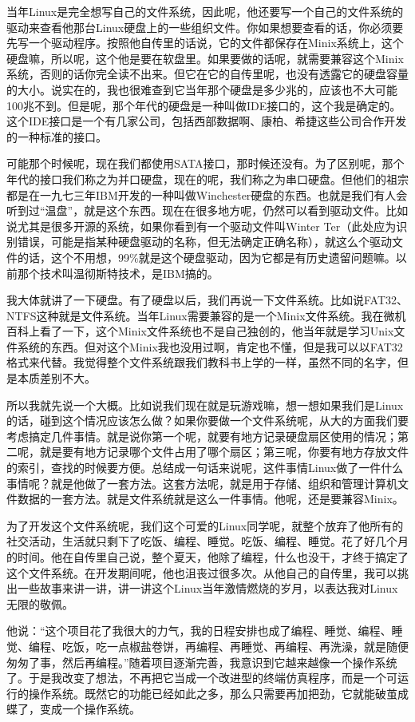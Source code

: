 \documentclass[
  letterpaper,
  DIV=11,
  numbers=noendperiod]{scrreprt}
\begin{document}
当年Linux是完全想写自己的文件系统，因此呢，他还要写一个自己的文件系统的驱动来查看他那台Linux硬盘上的一些组织文件。你如果想要查看的话，你必须要先写一个驱动程序。按照他自传里的话说，它的文件都保存在Minix系统上，这个硬盘嘛，所以呢，这个他是要在软盘里。如果要做的话呢，就需要兼容这个Minix系统，否则的话你完全读不出来。但它在它的自传里呢，也没有透露它的硬盘容量的大小。说实在的，我也很难查到它当年那个硬盘是多少兆的，应该也不大可能100兆不到。但是呢，那个年代的硬盘是一种叫做IDE接口的，这个我是确定的。这个IDE接口是一个有几家公司，包括西部数据啊、康柏、希捷这些公司合作开发的一种标准的接口。

可能那个时候呢，现在我们都使用SATA接口，那时候还没有。为了区别呢，那个年代的接口我们称之为并口硬盘，现在的呢，我们称之为串口硬盘。但他们的祖宗都是在一九七三年IBM开发的一种叫做Winchester硬盘的东西。也就是我们有人会听到过``温盘''，就是这个东西。现在在很多地方呢，仍然可以看到驱动文件。比如说尤其是很多开源的系统，如果你看到有一个驱动文件叫Winter
Ter（此处应为识别错误，可能是指某种硬盘驱动的名称，但无法确定正确名称），就这么个驱动文件的话，这个不用想，99\%就是这个硬盘驱动，因为它都是有历史遗留问题嘛。以前那个技术叫温彻斯特技术，是IBM搞的。

我大体就讲了一下硬盘。有了硬盘以后，我们再说一下文件系统。比如说FAT32、NTFS这种就是文件系统。当年Linux需要兼容的是一个Minix文件系统。我在微机百科上看了一下，这个Minix文件系统也不是自己独创的，他当年就是学习Unix文件系统的东西。但对这个Minix我也没用过啊，肯定也不懂，但是我可以以FAT32格式来代替。我觉得整个文件系统跟我们教科书上学的一样，虽然不同的名字，但是本质差别不大。

所以我就先说一个大概。比如说我们现在就是玩游戏嘛，想一想如果我们是Linux的话，碰到这个情况应该怎么做？如果你要做一个文件系统呢，从大的方面我们要考虑搞定几件事情。就是说你第一个呢，就要有地方记录硬盘扇区使用的情况；第二呢，就是要有地方记录哪个文件占用了哪个扇区；第三呢，你要有地方存放文件的索引，查找的时候要方便。总结成一句话来说呢，这件事情Linux做了一件什么事情呢？就是他做了一套方法。这套方法呢，就是用于存储、组织和管理计算机文件数据的一套方法。就是文件系统就是这么一件事情。他呢，还是要兼容Minix。

为了开发这个文件系统呢，我们这个可爱的Linux同学呢，就整个放弃了他所有的社交活动，生活就只剩下了吃饭、编程、睡觉。吃饭、编程、睡觉。花了好几个月的时间。他在自传里自己说，整个夏天，他除了编程，什么也没干，才终于搞定了这个文件系统。在开发期间呢，他也沮丧过很多次。从他自己的自传里，我可以挑出一些故事来讲一讲，讲一讲这个Linux当年激情燃烧的岁月，以表达我对Linux无限的敬佩。

他说：``这个项目花了我很大的力气，我的日程安排也成了编程、睡觉、编程、睡觉、编程、吃饭，吃一点椒盐卷饼，再编程、再睡觉、再编程、再洗澡，就是随便匆匆了事，然后再编程。''随着项目逐渐完善，我意识到它越来越像一个操作系统了。于是我改变了想法，不再把它当成一个改进型的终端仿真程序，而是一个可运行的操作系统。既然它的功能已经如此之多，那么只需要再加把劲，它就能破茧成蝶了，变成一个操作系统。
\end{document}
